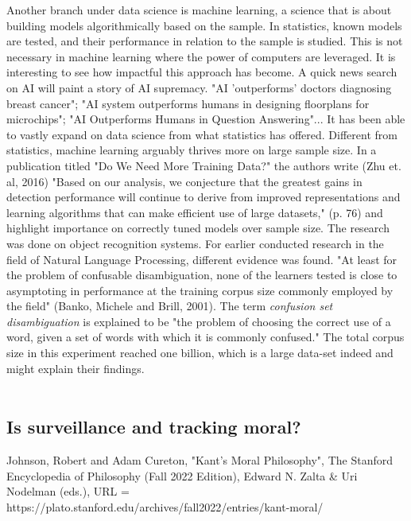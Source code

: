 \documentclass[11pt]{article}
\begin{document}
Another branch under data science is machine learning, a science that is about building models algorithmically based on the sample. In statistics, known models are tested, and their performance in relation to the sample is studied. This is not necessary in machine learning where the power of computers are leveraged. It is interesting to see how impactful this approach has become. A quick news search on AI will paint a story of AI supremacy. "AI 'outperforms' doctors diagnosing breast cancer"; "AI system outperforms humans in designing floorplans for microchips"; "AI Outperforms Humans in Question Answering"... It has been able to vastly expand on data science from what statistics has offered. Different from statistics, machine learning arguably thrives more on large sample size. In a publication titled "Do We Need More Training Data?" the authors write (Zhu et. al, 2016) "Based on our analysis, we conjecture that the greatest gains in detection performance will continue to derive from improved representations and learning algorithms that can make efficient use of large datasets," (p. 76) and highlight importance on correctly tuned models over sample size. The research was done on object recognition systems. For earlier conducted research in the field of Natural Language Processing, different evidence was found. "At least for the problem of confusable disambiguation, none of the learners tested is close to asymptoting in performance at the training corpus size commonly employed by the field" (Banko, Michele and Brill, 2001). The term \textit{confusion set disambiguation} is explained to be "the problem of choosing the correct use of a word, given a set of words with which it is commonly confused." The total corpus size in this experiment reached one billion, which is a large data-set indeed and might explain their findings. \\ \\

\subsection{Is surveillance and tracking moral?}


Johnson, Robert and Adam Cureton, "Kant’s Moral Philosophy", The Stanford Encyclopedia of Philosophy (Fall 2022 Edition), Edward N. Zalta \& Uri Nodelman (eds.), URL = https://plato.stanford.edu/archives/fall2022/entries/kant-moral/\.\\ \\
\end{document}
